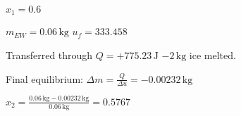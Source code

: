\( x_1 = 0.6 \)  

\( m_{EW} = 0.06 \, \text{kg} \)  
\( u_f = 333.458 \)  

Transferred through \( Q = +775.23 \, \text{J} \)  
\(-2 \, \text{kg ice melted.} \)  

Final equilibrium:  
\( \Delta m = \frac{Q}{\Delta u} = -0.00232 \, \text{kg} \)  

\( x_2 = \frac{0.06 \, \text{kg} - 0.00232 \, \text{kg}}{0.06 \, \text{kg}} = 0.5767 \)